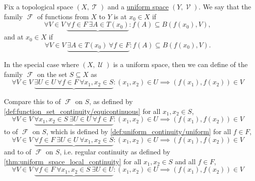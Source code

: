 \begin{definition}\label{def:function_set_continuity}
  Fix a topological space \( (X, \mscrT) \) and a \hyperref[def:uniform_space]{uniform space} \( (Y, \mscrV) \). We say that the family \( \mscrF \) of functions from \( X \) to \( Y \) is  at \( x_0 \in X \) if
  \begin{equation}\label{def:function_set_continuity/functionwise}
    \forall V \in V \ \underbrace{\forall f \in F \ \exists A \in T(x_0)} : f(A) \subseteq B(f(x_0), V),
  \end{equation}
  and  at \( x_0 \in X \) if
  \begin{equation}\label{def:function_set_continuity/equicontinuous}
    \forall V \in V \ \underbrace{\exists A \in T(x_0) \ \forall f \in F} : f(A) \subseteq B(f(x_0), V).
  \end{equation}

  In the special case where \( (X, \mscrU) \) is a uniform space, then we can define  of the family \( \mscrF \) on the set \( S \subseteq X \) as
  \begin{equation}\label{def:function_set_continuity/uniform_equicontinuous}
    \forall V \in V \ \underbrace{\exists U \in U \ \forall f \in F \ \forall x_1, x_2 \in S} : (x_1, x_2) \in U \implies (f(x_1), f(x_2)) \in V
  \end{equation}

  Compare this to  of \( \mscrF \) on \( S \), as defined by \cref{def:function_set_continuity/equicontinuous} for all \( x_1, x_2 \in S \),
  \begin{equation}\label{def:function_set_continuity/pointwise_equicontinuous}
    \forall V \in V \ \underbrace{\forall x_1, x_2 \in S \ \exists U \in U \ \forall f \in F} : (x_1, x_2) \in U \implies (f(x_1), f(x_2)) \in V
  \end{equation}
  to  of \( \mscrF \) on \( S \), which is defined by \cref{def:uniform_continuity/uniform} for all \( f \in F \),
  \begin{equation}\label{def:function_set_continuity/uniform_functionwise}
    \forall V \in V \ \underbrace{\forall f \in F \ \exists U \in U \ \forall x_1, x_2 \in S} : (x_1, x_2) \in U \implies (f(x_1), f(x_2)) \in V
  \end{equation}
  and to  of \( \mscrF \) on \( S \), i.e. regular continuity as defined by \cref{thm:uniform_space_local_continuity} for all \( x_1, x_2 \in S \) and all \( f \in F \),
  \begin{equation}\label{def:function_set_continuity/functionwise_pointwise}
    \forall V \in V \ \underbrace{\forall f \in F \ \forall x_1, x_2 \in S \ \exists U \in U} : (x_1, x_2) \in U \implies (f(x_1), f(x_2)) \in V
  \end{equation}
\end{definition}

